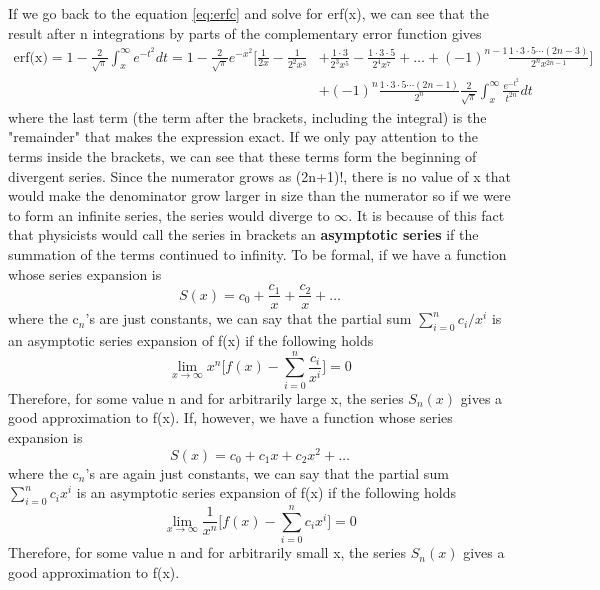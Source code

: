 \documentclass{article}
\newcommand{\be}{\begin{equation}}
\newcommand{\ee}{\end{equation}}
\begin{document}
If we go back to the equation \ref{eq:erfc} and solve for erf(x), we can see that the result after n integrations by parts of the complementary error function gives
\be
  \begin{split}
    \text{erf(x)} = 1 - \frac{2}{\sqrt{\pi}} \int_x^{\infty} e^{-t^2} dt = 1 - \frac{2}{\sqrt{\pi}} e^{-x^2} \Big[ \frac{1}{2x} - \frac{1}{2^2 x^3} & + \frac{1 \cdot 3}{2^3 x^5} - \frac{1 \cdot 3 \cdot 5}{2^4 x^7} + \hdots + (-1)^{n-1} \frac{1 \cdot 3 \cdot 5 \cdots (2n-3)}{2^n x^{2n-1}} \Big] \\
    & + (-1)^n \frac{1 \cdot 3 \cdot 5 \cdots (2n-1)}{2^n} \frac{2}{\sqrt{\pi}} \int_x^{\infty} \frac{e^{-t^2}}{t^{2n}} dt
  \end{split}
\ee
where the last term (the term after the brackets, including the integral) is the "remainder" that makes the expression exact.
If we only pay attention to the terms inside the brackets, we can see that these terms form the beginning of divergent series.
Since the numerator grows as (2n+1)!, there is no value of x that would make the denominator grow larger in size than the numerator so if we were to form an infinite series, the series would diverge to $\infty$.
It is because of this fact that physicists would call the series in brackets an \textbf{asymptotic series} if the summation of the terms continued to infinity.
To be formal, if we have a function whose series expansion is
\be
S(x) = c_0 + \frac{c_1}{x} + \frac{c_2}{x} + \hdots
\ee
where the c$_n$'s are just constants, we can say that the partial sum $\sum\limits_{i=0}^n c_i / x^i$ is an asymptotic series expansion of f(x) if the following holds
\be
  \lim_{x \to \infty} x^n \Big[ f(x) - \sum_{i=0}^n \frac{c_i}{x^i} \Big] = 0
\ee
Therefore, for some value n and for arbitrarily large x, the series $S_n(x)$ gives a good approximation to f(x).
If, however, we have a function whose series expansion is
\be
  S(x) = c_0 + c_1x + c_2x^2 + \hdots
\ee
where the c$_n$'s are again just constants, we can say that the partial sum  $\sum\limits_{i=0}^n c_i x^i$ is an asymptotic series expansion of f(x) if the following holds
\be
  \lim_{x \to \infty} \frac{1}{x^n} \Big[ f(x) - \sum_{i=0}^n c_i x^i \Big] = 0
\ee
Therefore, for some value n and for arbitrarily small x, the series $S_n(x)$ gives a good approximation to f(x).
\end{document}
